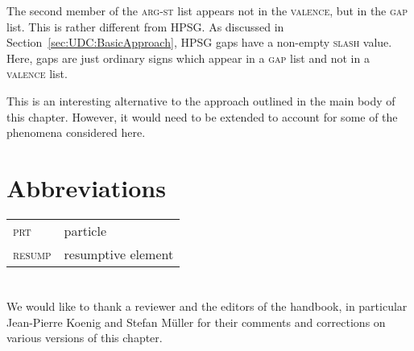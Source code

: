 \documentclass[output=paper,biblatex,babelshorthands,newtxmath,draftmode,colorlinks,citecolor=brown]{langscibook}
\begin{document}
\begin{exe}
  \ex \label{ex:UDC:SBCG:gap}

\end{exe}
	
\noindent
The second member of the \textsc{arg-st} list appears not in the
\textsc{valence}, but in the \textsc{gap} list. This is rather
different from HPSG. As discussed in
Section~\ref{sec:UDC:BasicApproach}, HPSG gaps have a non-empty
\textsc{slash} value. Here, gaps are just ordinary signs which appear
in a \textsc{gap} list and not in a \textsc{valence} list.

This is an interesting alternative to the approach outlined in the
main body of this chapter. However, it would need to be extended to
account for some of the phenomena considered here.



\section*{Abbreviations}

\begin{tabularx}{.99\textwidth}{@{}lX}
\textsc{prt} & particle\\
\textsc{resump} & resumptive element \\
\end{tabularx}



\section*{\acknowledgmentsEN}

We would like to thank a reviewer and the editors of the handbook, in particular
Jean-Pierre Koenig and Stefan Müller for their comments and
corrections on various versions of this chapter. 





 

{\sloppy
\printbibliography[heading=subbibliography,notkeyword=this]
}
\end{document}
